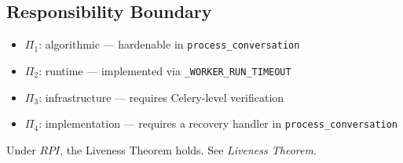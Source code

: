 \subsection*{Responsibility Boundary}

\begin{itemize}
  \item $\Pi_1$: algorithmic — hardenable in \texttt{process\_conversation}
  \item $\Pi_2$: runtime — implemented via \texttt{\_WORKER\_RUN\_TIMEOUT}
  \item $\Pi_3$: infrastructure — requires Celery-level verification
  \item $\Pi_4$: implementation — requires a recovery handler in \texttt{process\_conversation}
\end{itemize}

Under $RPI$, the Liveness Theorem holds. See \textit{Liveness Theorem}.